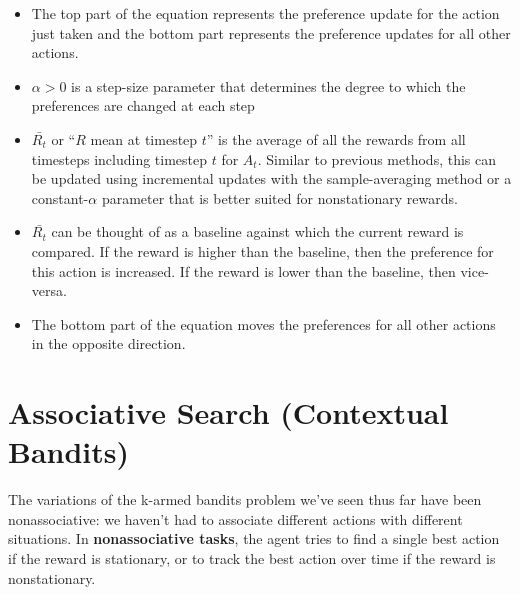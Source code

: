 \begin{itemize}
    \item The top part of the equation represents the preference update for the action just taken and the bottom part represents the preference updates for all other actions.
    \item $\alpha > 0$ is a step-size parameter that determines the degree to which the preferences are changed at each step
    \item $\bar{R_t}$ or “$R$ mean at timestep $t$” is the average of all the rewards from all timesteps including timestep $t$ for $A_t$. Similar to previous methods, this can be updated using incremental updates with the sample-averaging method or a constant-$\alpha$ parameter that is better suited for nonstationary rewards.
    \item $\bar{R_t}$ can be thought of as a baseline against which the current reward is compared. If the reward is higher than the baseline, then the preference for this action is increased. If the reward is lower than the baseline, then vice-versa.
    \item The bottom part of the equation moves the preferences for all other actions in the opposite direction.
\end{itemize}


\section{Associative Search (Contextual Bandits) \cite{medium-numsmt2-rl-ch2-part-6, kaggle-parsasam-reinforcement-learning-notes-multi-armed-bandits}}\label{Associative Search}

The variations of the k-armed bandits problem we’ve seen thus far have been nonassociative: we haven’t had to associate different actions with different situations. In \textbf{nonassociative tasks}, the agent tries to find a single best action if the reward is stationary, or to track the best action over time if the reward is nonstationary.

